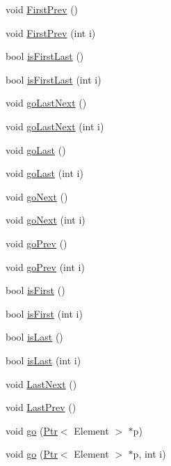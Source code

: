 \begin{CompactItemize}
\item 
void \hyperlink{classContainer_2be8f87e042ee57db8b1defb95e99ff2}{FirstPrev} ()
\item 
void \hyperlink{classContainer_6845f750fe81c0366e291a59aabbf0fc}{FirstPrev} (int i)
\item 
bool \hyperlink{classContainer_167afe8b220e609e29f62a261a32911d}{isFirstLast} ()
\item 
bool \hyperlink{classContainer_e1a46424973ba9bc31991ecc1eed7acf}{isFirstLast} (int i)
\item 
void \hyperlink{classContainer_472c50cebb8e028054a4ff378596b187}{goLastNext} ()
\item 
void \hyperlink{classContainer_92a1e8ac5983084378d5a21c18b4326d}{goLastNext} (int i)
\item 
void \hyperlink{classContainer_bf6167a3f9e7187e7a014b8bfeba49ae}{goLast} ()
\item 
void \hyperlink{classContainer_21772656f0b4b9b273cc98bd9e59de9b}{goLast} (int i)
\item 
void \hyperlink{classContainer_e72c7b7cbc6c1478505d1f919e565d11}{goNext} ()
\item 
void \hyperlink{classContainer_96a071140e5a7fcbfe910c60931c3f09}{goNext} (int i)
\item 
void \hyperlink{classContainer_b4adc89822cc419ca17790065c0d0726}{goPrev} ()
\item 
void \hyperlink{classContainer_e8b99ee9fa0ef149f68c7dd44bddc48e}{goPrev} (int i)
\item 
bool \hyperlink{classContainer_8d98895b53295450a717e2cfbbce0e6e}{isFirst} ()
\item 
bool \hyperlink{classContainer_22616a14e764ca2d2c45d4412d84039a}{isFirst} (int i)
\item 
bool \hyperlink{classContainer_e252da66eea8ad52294ccf69e4393e6b}{isLast} ()
\item 
bool \hyperlink{classContainer_4213c7c9f238c8c8ad972bcdb157cbad}{isLast} (int i)
\item 
void \hyperlink{classContainer_275dceb5293e10b90c1d5ed544bda080}{LastNext} ()
\item 
void \hyperlink{classContainer_b5276a9d4e1d741f0d12379cc6122d7a}{LastPrev} ()
\item 
void \hyperlink{classContainer_569092a3dec9b9a0dc300d4b421742c4}{go} (\hyperlink{structPtr}{Ptr}$<$ Element $>$ $\ast$p)
\item 
void \hyperlink{classContainer_0887069d98e5231010e5ceaff6a46682}{go} (\hyperlink{structPtr}{Ptr}$<$ Element $>$ $\ast$p, int i)

\end{CompactItemize}

